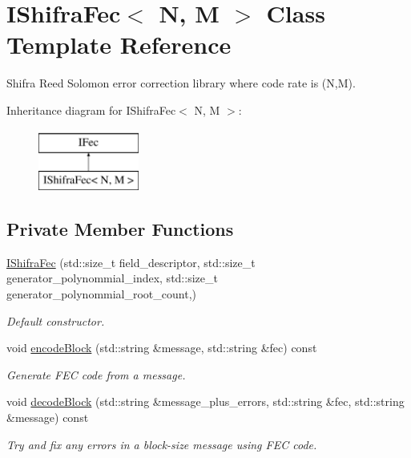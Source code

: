 \hypertarget{classefb_1_1IShifraFec}{
\section{IShifraFec$<$ N, M $>$ Class Template Reference}
\label{classefb_1_1IShifraFec}
}


Shifra Reed Solomon error correction library where code rate is (N,M).  


Inheritance diagram for IShifraFec$<$ N, M $>$:\begin{figure}[H]
\begin{center}
\leavevmode
\includegraphics[height=2.000000cm]{classefb_1_1IShifraFec}
\end{center}
\end{figure}
\subsection*{Private Member Functions}
\begin{DoxyCompactItemize}
\item 
\hyperlink{classefb_1_1IShifraFec_ac279ca12376dc17e5e2f3e82fed70615}{IShifraFec} (std::size\_\-t field\_\-descriptor, std::size\_\-t generator\_\-polynommial\_\-index, std::size\_\-t generator\_\-polynommial\_\-root\_\-count,)
\begin{DoxyCompactList}\small\item\em Default constructor. \item\end{DoxyCompactList}\item 
void \hyperlink{classefb_1_1IShifraFec_abfa614d594bf4d7c86b6a8817f35dec5}{encodeBlock} (std::string \&message, std::string \&fec) const 
\begin{DoxyCompactList}\small\item\em Generate FEC code from a message. \item\end{DoxyCompactList}\item 
void \hyperlink{classefb_1_1IShifraFec_a00958e2a880e71ba6a8b6a0e8f560c45}{decodeBlock} (std::string \&message\_\-plus\_\-errors, std::string \&fec, std::string \&message) const 
\begin{DoxyCompactList}\small\item\em Try and fix any errors in a block-\/size message using FEC code. \item\end{DoxyCompactList}\end{DoxyCompactItemize}
